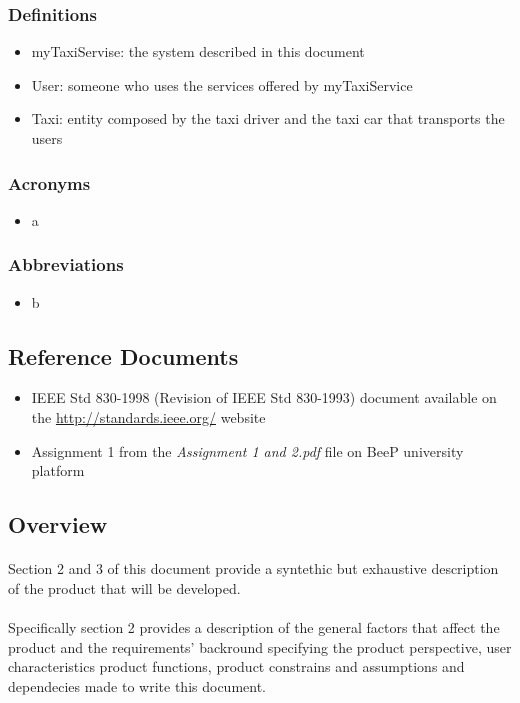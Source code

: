 		\subsubsection{Definitions}
		\begin{itemize}
			\item myTaxiServise: the system described in this document
			\item User: someone who uses the services offered by myTaxiService
			\item Taxi: entity composed by the taxi driver and the taxi car that transports the users
		\end{itemize}
		\subsubsection{Acronyms}
		\begin{itemize}
			\item a
		\end{itemize}
		\subsubsection{Abbreviations}
		\begin{itemize}
			\item b
		\end{itemize}
	\subsection{Reference Documents}
	\begin{itemize}
		\item IEEE Std 830-1998 (Revision of IEEE Std 830-1993) document available on the \url{http://standards.ieee.org/} website
		\item Assignment 1 from the \emph{Assignment 1 and 2.pdf} file on BeeP university platform
	\end{itemize}
	\subsection{Overview}
		\paragraph*{}Section 2 and 3 of this document provide a syntethic but exhaustive description of the product that will be developed.		
		\paragraph*{}Specifically section 2 provides a description of the general factors that affect the product and the requirements' backround specifying the product perspective, user characteristics product functions, product constrains and assumptions and dependecies made to write this document.
